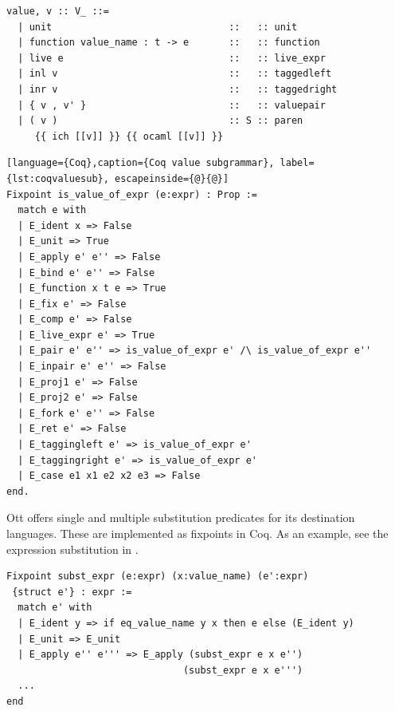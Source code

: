 \documentclass[12pt,twoside,notitlepage]{report}
\theoremstyle{plain}%
\theoremstyle{definition}
\theoremstyle{remark}
\begin{document}
\begin{enumerate}
{\begin{minipage}{\linewidth}
\begin{lstlisting}[language={Ott}, caption={Ott value subgrammar}, label={lst:ottvaluesub}]
value, v :: V_ ::=
  | unit                               ::   :: unit
  | function value_name : t -> e       ::   :: function
  | live e                             ::   :: live_expr
  | inl v                              ::   :: taggedleft
  | inr v                              ::   :: taggedright
  | { v , v' }                         ::   :: valuepair
  | ( v )                              :: S :: paren
     {{ ich [[v]] }} {{ ocaml [[v]] }}
\end{lstlisting}
\end{minipage}


\begin{minipage}{\linewidth}
\begin{lstlisting}[language={Coq},caption={Coq value subgrammar}, label={lst:coqvaluesub}, escapeinside={@}{@}]
Fixpoint is_value_of_expr (e:expr) : Prop :=
  match e with
  | E_ident x => False
  | E_unit => True
  | E_apply e' e'' => False
  | E_bind e' e'' => False
  | E_function x t e => True
  | E_fix e' => False
  | E_comp e' => False
  | E_live_expr e' => True
  | E_pair e' e'' => is_value_of_expr e' /\ is_value_of_expr e''
  | E_inpair e' e'' => False
  | E_proj1 e' => False
  | E_proj2 e' => False
  | E_fork e' e'' => False
  | E_ret e' => False
  | E_taggingleft e' => is_value_of_expr e'
  | E_taggingright e' => is_value_of_expr e'
  | E_case e1 x1 e2 x2 e3 => False
end.
\end{lstlisting}

\end{minipage}	
Ott offers single and multiple substitution predicates for its destination languages. These are implemented as fixpoints in Coq. As an example, see the expression substitution in .
\begin{minipage}{\linewidth}

\begin{lstlisting}[language={Coq},caption={Coq expression substitution}, label={lst:coqexprsubst}]
Fixpoint subst_expr (e:expr) (x:value_name) (e':expr) 
 {struct e'} : expr :=
  match e' with
  | E_ident y => if eq_value_name y x then e else (E_ident y)
  | E_unit => E_unit 
  | E_apply e'' e''' => E_apply (subst_expr e x e'') 
                               (subst_expr e x e''')
  ...
end
\end{lstlisting}


\end{minipage}}
\end{enumerate}
\end{document}
